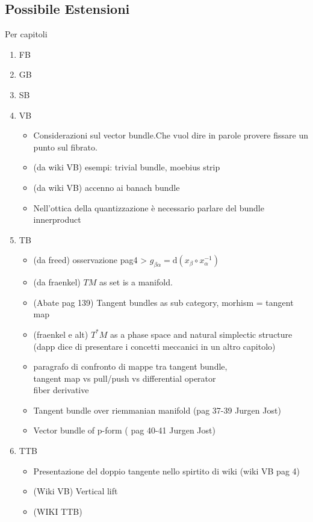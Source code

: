 \documentclass[a4paper,12pt]{scrartcl}    %
\begin{document}
\subsection{Possibile Estensioni}
Per capitoli
\begin{enumerate}
\item FB

\item GB

\item SB

\item VB
	\begin{itemize}
		 \item Considerazioni sul vector bundle.Che vuol dire in parole provere fissare un punto sul fibrato.
		 \item (da wiki VB) esempi: trivial bundle, moebius strip
		 \item (da wiki VB) accenno ai banach bundle
		 \item Nell'ottica della quantizzazione è necessario parlare  del bundle innerproduct
	\end{itemize}

\item TB
	\begin{itemize}
		 \item (da freed) osservazione pag4 > $g_{\beta \alpha} = \textrm{d} ( x_\beta \circ x_\alpha^{-1})$
		 \item (da fraenkel) $TM$ as set is a manifold.
		 \item (Abate pag 139) Tangent bundles as sub category, morhism = tangent map
		 \item (fraenkel e alt) $T^*M$ as a phase space and natural simplectic structure (dapp dice di presentare i concetti meccanici in un altro capitolo)
		 \item paragrafo di confronto di mappe tra tangent bundle,\\ tangent map vs pull/push vs differential operator \\ fiber derivative 
		 \item Tangent bundle over riemmanian manifold (pag 37-39 Jurgen Jost)
		 \item Vector bundle of p-form ( pag 40-41 Jurgen Jost)
	\end{itemize}

\item TTB
	\begin{itemize}
		 \item Presentazione del doppio tangente nello spirtito di wiki (wiki VB pag 4)
		 \item (Wiki VB) Vertical lift
		 \item (WIKI TTB)
	\end{itemize}
\end{enumerate}
\end{document}

